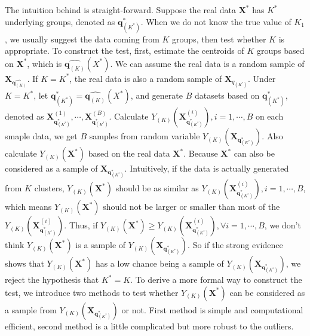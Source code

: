 \documentclass[12pt]{article}
\begin{document}
The intuition behind is straight-forward. Suppose the real data $\pmb X^*$ has $K^*$ underlying groups, denoted as $\pmb q_{(K^*)}^*$. When we do not know the true value of $K_1$, we usually suggest the data coming from $K$ groups, then test whether $K$ is appropriate. To construct the test, first, estimate the centroids of $K$ groups based on $\pmb X^*$, which is $\hat{\pmb q_{(K)}}(X^*)$.  We can assume the real data is a random sample of $\pmb X_{\hat{\pmb q_{(K)}}}$. If $K=K^*$, the real data is also a random sample of $\pmb X_{q_{(K^*)}}$. Under $K=K^*$, let $\pmb q_{(K^*)}^*= \hat{\pmb q_{(K)}}(X^*)$, and generate $B$ datasets based on $\pmb q_{(K^*)}^*$, denoted as $\pmb X_{\pmb q_{(K^*)}^*}^{(1)},\cdots,\pmb X_{\pmb q_{(K^*)}^*}^{(B)}$. Calculate $Y_{(K)}(\pmb X_{\pmb q_{(K^*)}^*}^{(i)}),i=1,\cdots,B$ on each smaple data, we get $B$ samples from random variable $Y_{(K)}(\pmb X_{\pmb q_{(K^*)}^*})$. Also calculate $Y_{(K)}(\pmb X^*)$ based on the real data $\pmb X^*$. Because $\pmb X^*$ can also be considered as a sample of $\pmb X_{\pmb q^*_{(K^*)}}$. Intuitively, if the data is actually generated from $K$ clusters, $Y_{(K)}(\pmb X^*)$ should be as similar as $Y_{(K)}(\pmb X_{\pmb q_{(K^*)}^*}^{(i)}),i=1,\cdots,B$, which means  $Y_{(K)}(\pmb X^*)$ should not be larger or smaller than most of the  $Y_{(K)}(\pmb X_{\pmb q_{(K^*)}^*}^{(i)})$. Thus, if $Y_{(K)}(\pmb X^*) \geq Y_{(K)}(\pmb X_{\pmb q_{(K^*)}^*}^{(i)}),\forall i=1,\cdots,B$, we don't think $Y_{(K)}(\pmb X^*)$ is a sample of $Y_{(K)}(\pmb X_{\pmb q_{(K^*)}^*})$. So if the strong evidence shows that $Y_{(K)}(\pmb X^*)$ has a low chance being a sample of $Y_{(K)}(\pmb X_{\pmb q_{(K^*)}^*})$, we reject the hypothesis that $K^*=K$. To derive a more formal way to construct the test, we introduce two methods to test whether $Y_{(K)}(\pmb X^*)$ can be considered as a sample from $Y_{(K)}(\pmb X_{\pmb q_{(K^*)}^*})$ or not. First method is simple and computational efficient, second method is a little complicated but more robust to the outliers.
\end{document}

